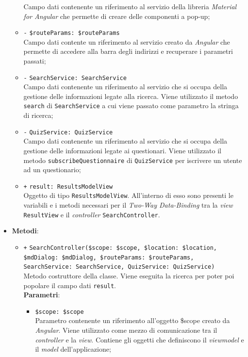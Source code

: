 \begin{itemize}
\begin{itemize}
		Campo dati contenente un riferimento al servizio della libreria \textit{Material for Angular} che permette di creare delle componenti a pop-up;
		\item \texttt{-} \texttt{\$routeParams: \$routeParams} \\
		Campo dati contente un riferimento al servizio creato da \textit{Angular} che permette di accedere alla barra degli indirizzi e recuperare i parametri passati; 
		\item \texttt{-} \texttt{SearchService: SearchService} \\
		Campo dati contenente un riferimento al servizio che si occupa della gestione delle informazioni legate alla ricerca. Viene utilizzato il metodo \texttt{search} di \texttt{SearchService} a cui viene passato come parametro la stringa di ricerca;
		\item \texttt{-} \texttt{QuizService: QuizService} \\
		Campo dati contenente un riferimento al servizio che si occupa della gestione delle informazioni legate ai questionari. Viene utilizzato il metodo \texttt{subscribeQuestionnaire} di \texttt{QuizService} per iscrivere un utente ad un questionario;
		\item \texttt{+} \texttt{result: ResultsModelView} \\
		Oggetto di tipo \texttt{ResultsModelView}. All'interno di esso sono presenti le variabili e i metodi necessari per il \textit{Two-Way Data-Binding} tra la \textit{view} \texttt{ResultView} e il \textit{controller} \texttt{SearchController}.
	\end{itemize}
	\item \textbf{Metodi}:
	\begin{itemize}
		\item \texttt{+} \texttt{SearchController(\$scope: \$scope, \$location: \$location, \$mdDialog: \$mdDialog, \$routeParams: \$routeParams, SearchService: SearchService, QuizService: QuizService)} \\
		Metodo costruttore della classe. Viene eseguita la ricerca per poter poi popolare il campo dati \texttt{result}. \\
		\textbf{Parametri}:
		\begin{itemize}
			\item \texttt{\$scope: \$scope} \\
			Parametro contenente un riferimento all'oggetto \$scope creato da \textit{Angular}. Viene utilizzato come mezzo di comunicazione tra il \textit{controller} e la \textit{view}. Contiene gli oggetti che definiscono il \textit{viewmodel} e il \textit{model} dell'applicazione;

\end{itemize}
\end{itemize}
\end{itemize}
